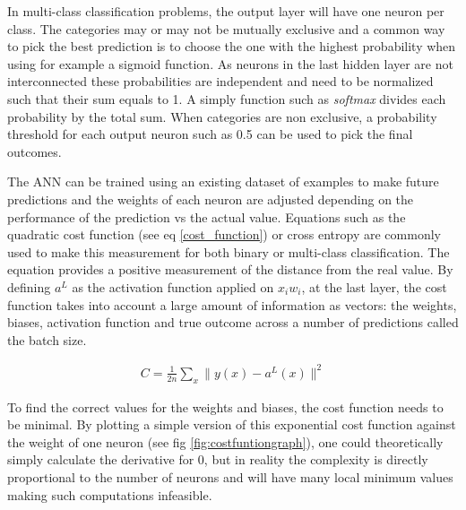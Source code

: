 \documentclass[proposal]{softeng}
\begin{document}
In multi-class classification problems, the output layer will have one neuron per class. The categories may or may not be mutually exclusive and a common way to pick the best prediction is to choose the one with the highest probability when using for example a sigmoid function. As neurons in the last hidden layer are not interconnected these probabilities are independent and need to be normalized such that their sum equals to 1. A simply function such as \textit{softmax} divides each probability by the total sum. When categories are non exclusive, a probability threshold for each output neuron such as 0.5 can be used to pick the final outcomes.

The ANN can be trained using an existing dataset of examples to make future predictions and the weights of each neuron are adjusted depending on the performance of the prediction vs the actual value. Equations such as the quadratic cost function (see eq \ref{cost_function}) or cross entropy are commonly used to make this measurement for both binary or multi-class classification. The equation provides a positive measurement of the distance from the real value. By defining \( a^L  \) as the activation function applied on \( {x_{i}} {w_{i}} \), at the last layer, the cost function takes into account a large amount of information as vectors: the weights, biases, activation function and true outcome across a number of predictions called the batch size.

\begin{eqnarray}
\label{cost_function}
  C = \frac{1}{2n} \sum_x \|y(x)-a^L(x)\|^2
\end{eqnarray}

To find the correct values for the weights and biases,  the cost function needs to be minimal. By plotting a simple version of this exponential cost function against the weight of one neuron (see fig \ref{fig:costfuntiongraph}), one could theoretically simply calculate the derivative for 0, but in reality the complexity is directly proportional to the number of neurons and will have many local minimum values making such computations infeasible.
\end{document}
